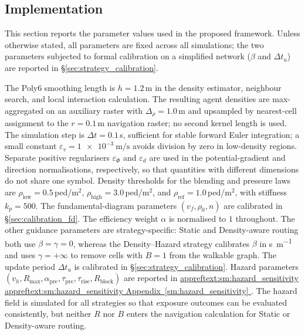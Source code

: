 \documentclass[preprint,12pt]{elsarticle}
\providecommand{\FloatBarrier}{}
\let\origsubsection\subsection
\renewcommand{\subsection}{\FloatBarrier\origsubsection}
\DeclareRobustCommand{\appref}[1]{%
  \hyperref[#1]{%
    \ifcsname appreftext:#1\endcsname%
      \csname appreftext:#1\endcsname%
    \else%
      Appendix~\ref*{#1}%
    \fi%
  }%
}
\begin{document}
\subsection{Implementation}
\label{sec:implementation}

This section reports the parameter values used in the proposed
framework. Unless otherwise stated, all parameters are fixed across all
simulations; the two parameters subjected to formal calibration on a
simplified network ($\beta$ and $\Delta t_u$) are reported in
\S\ref{sec:strategy_calibration}.

The Poly6 smoothing length is $h=1.2$\,m in the density estimator,
neighbour search, and local interaction calculation. The resulting
agent densities are max-aggregated on an auxiliary raster with
$\Delta_\rho=1.0$\,m and upsampled by nearest-cell assignment to the
$r=0.1$\,m navigation raster; no second kernel length is used. The
simulation step is $\Delta t = 0.1$\,s, sufficient for
stable forward Euler integration; a small constant
$\varepsilon_v = \SI{1e-3}{\meter\per\second}$ avoids division by zero in
low-density regions.
Separate positive regularisers $\varepsilon_\Phi$ and $\varepsilon_d$ are
used in the potential-gradient and direction normalisations, respectively,
so that quantities with different dimensions do not share one symbol.
Density thresholds for the blending and pressure laws are
$\rho_{\mathrm{low}} = 0.5$\,ped/m$^2$,
$\rho_{\mathrm{high}} = 3.0$\,ped/m$^2$, and
$\rho_{\mathrm{ref}} = 1.0$\,ped/m$^2$, with stiffness $k_p = 500$. The
fundamental-diagram parameters $(v_f, \rho_0, n)$ are calibrated in
\S\ref{sec:calibration_fd}. The efficiency weight $\alpha$ is normalised
to $1$ throughout. The other guidance parameters are strategy-specific:
Static and Density-aware routing both use $\beta=\gamma=0$, whereas the
Density--Hazard strategy calibrates $\beta$ in
\si{\second\per\meter} and uses $\gamma=+\infty$ to remove cells with
$B=1$ from the walkable graph.
The update period $\Delta t_u$ is
calibrated in \S\ref{sec:strategy_calibration}. Hazard parameters
$(v_h, R_{\max}, \alpha_{\mathrm{pre}}, \tau_{\mathrm{pre}},
\tau_{\mathrm{rise}}, R_{\mathrm{block}})$ are reported in
\appref{sm:hazard_sensitivity}. The hazard field is simulated for all
strategies so that exposure outcomes can be evaluated consistently, but
neither $R$ nor $B$ enters the navigation calculation for Static or
Density-aware routing.
\end{document}
